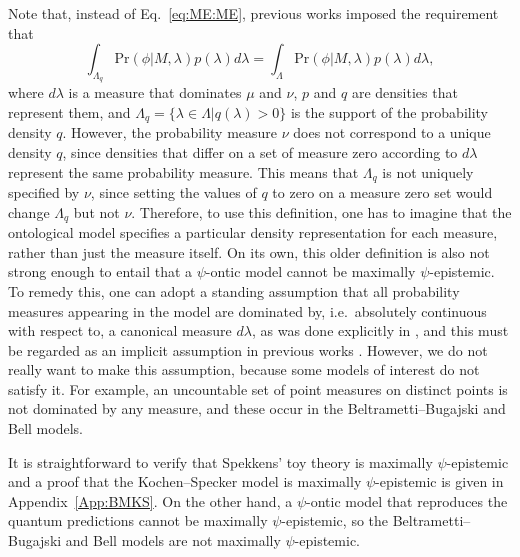 \documentclass[DIV=calc,fontsize=12pt]{scrartcl} %
\theoremstyle{definition}
\theoremstyle{plain}
\begin{document}
Note that, instead of Eq.~\eqref{eq:ME:ME}, previous works
\cite{Harrigan2007, Maroney2012, Maroney2012a, Leifer2013c} imposed
the requirement that
\begin{equation}
\label{eq:ME:MEold}
\int_{\Lambda_{q}} \text{Pr}(\phi|M,\lambda)p(\lambda) d\lambda =
\int_{\Lambda} \text{Pr}(\phi|M,\lambda)p(\lambda) d\lambda,
\end{equation}
where $d\lambda$ is a measure that dominates $\mu$ and $\nu$, $p$ and
$q$ are densities that represent them, and $\Lambda_{q} = \{\lambda
\in \Lambda | q(\lambda) > 0\}$ is the support of the probability
density $q$.  However, the probability measure $\nu$ does not
correspond to a unique density $q$, since densities that differ on a
set of measure zero according to $d \lambda$ represent the same
probability measure.  This means that $\Lambda_q$ is not uniquely
specified by $\nu$, since setting the values of $q$ to zero on a
measure zero set would change $\Lambda_q$ but not $\nu$.  Therefore,
to use this definition, one has to imagine that the ontological model
specifies a particular density representation for each measure, rather
than just the measure itself.  On its own, this older definition is
also not strong enough to entail that a $\psi$-ontic model cannot be
maximally $\psi$-epistemic.  To remedy this, one can adopt a standing
assumption that all probability measures appearing in the model are
dominated by, i.e.\ absolutely continuous with respect to, a canonical
measure $d\lambda$, as was done explicitly in \cite{Leifer2013c}, and
this must be regarded as an implicit assumption in previous works
\cite{Harrigan2007, Maroney2012, Maroney2012a}.  However, we do not
really want to make this assumption, because some models of interest
do not satisfy it.  For example, an uncountable set of point measures
on distinct points is not dominated by any measure, and these occur in
the Beltrametti--Bugajski and Bell models.

It is straightforward to verify that Spekkens' toy theory is maximally
$\psi$-epistemic and a proof that the Kochen--Specker model is
maximally $\psi$-epistemic is given in Appendix~\ref{App:BMKS}.  On
the other hand, a $\psi$-ontic model that reproduces the quantum
predictions cannot be maximally $\psi$-epistemic, so the
Beltrametti--Bugajski and Bell models are not maximally
$\psi$-epistemic.
\end{document}
